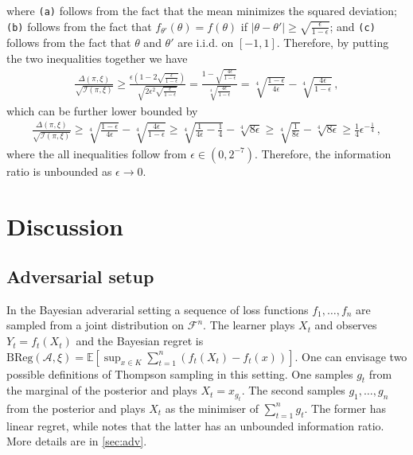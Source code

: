 \documentclass[letter, 12pt]{report}
\newcommand{\BReg}{\textrm{BReg}}
\newcommand{\paren}[1]{\left( #1 \right)}
\newcommand{\E}{\mathbb E}
\newcommand{\sF}{\mathscr F}
\newcommand{\sA}{\mathscr A}
\newcommand{\I}{\mathcal{I}}
\newcommand{\1}{\mathbf{1}}
\theoremstyle{plain}
\theoremstyle{definition}
\theoremstyle{remark}
\begin{document}
where \texttt{(a)} follows from the fact that the mean minimizes the squared deviation;
\texttt{(b)} follows from the fact that $f_{\theta'}(\theta) = f(\theta)$
if $|\theta - \theta'| \geq \sqrt{\frac{\epsilon}{1-\epsilon}}$;
and \texttt{(c)} follows from the fact that $\theta$ and $\theta'$ are i.i.d. on $[-1,1]$.
Therefore, by putting the two inequalities together we have
\begin{align*}
    \frac{
        \Delta(\pi, \xi)
    }{
        \sqrt{\I(\pi, \xi)}
    }
    \geq
    \frac{
        \epsilon \paren{1 - 2 \sqrt{\frac{\epsilon}{1-\epsilon}}}
    }{
        \sqrt{2 \epsilon^2\sqrt{\frac{\epsilon}{1-\epsilon}}}
    }
    =
    \frac{
        1 - \sqrt{\frac{4\epsilon}{1-\epsilon}}
    }{
        \sqrt[4]{\frac{4\epsilon}{1-\epsilon}}
    }
    =
    \sqrt[4]{\frac{1-\epsilon}{4\epsilon}}
    -
    \sqrt[4]{\frac{4\epsilon}{1-\epsilon}}\,,
\end{align*}
which can be further lower bounded by
\begin{align*}
    \frac{
        \Delta(\pi, \xi)
    }{
        \sqrt{\I(\pi, \xi)}
    }
    \geq
    \sqrt[4]{\frac{1-\epsilon}{4\epsilon}}
    -
    \sqrt[4]{\frac{4\epsilon}{1-\epsilon}}
    \geq
    \sqrt[4]{\frac{1}{4\epsilon} - \frac{1}{4}}
    -
    \sqrt[4]{8\epsilon}
    \geq
    \sqrt[4]{\frac{1}{8\epsilon}}
    -
    \sqrt[4]{8\epsilon}
    \geq
    \frac{1}{4}\epsilon^{-\frac14}\,,
\end{align*}
where the all inequalities follow from $\epsilon \in (0,2^{-7})$.
Therefore, the information ratio is unbounded as $\epsilon \to 0$.

\chapter{Discussion}
\section{Adversarial setup} In the Bayesian adverarial setting a sequence of loss functions $f_1,\ldots,f_n$ are sampled from a joint distribution on $\sF^n$.
The learner plays $X_t$ and observes $Y_t = f_t(X_t)$ and the Bayesian regret is
$\BReg(\sA, \xi) = \E[\sup_{x \in K} \sum_{t=1}^n (f_t(X_t) - f_t(x))]$.
One can envisage two possible definitions of Thompson sampling in this setting. One samples $g_t$ from the marginal of the posterior and plays $X_t = x_{g_t}$.
The second samples $g_1,\ldots,g_n$ from the posterior and plays $X_t$ as the minimiser of $\sum_{t=1}^n g_t$.
The former has linear regret, while \cite{BDKP15} notes
that the latter has an unbounded information ratio. More details are in \cref{sec:adv}.
\end{document}
